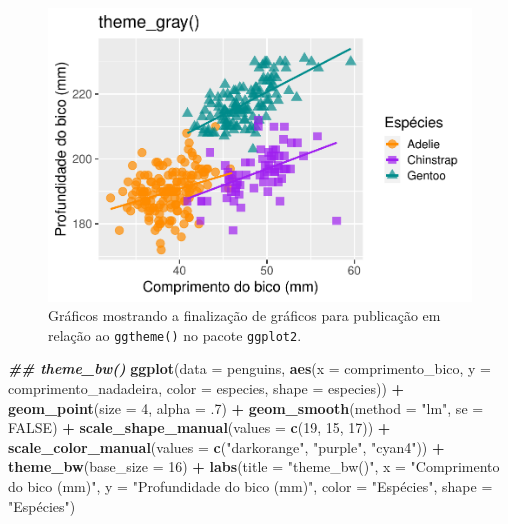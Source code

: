 \documentclass[
]{article}
\newenvironment{Shaded}{\begin{snugshade}}{\end{snugshade}}
\newcommand{\AttributeTok}[1]{\textcolor[rgb]{0.13,0.29,0.53}{#1}}
\newcommand{\ConstantTok}[1]{\textcolor[rgb]{0.56,0.35,0.01}{#1}}
\newcommand{\DecValTok}[1]{\textcolor[rgb]{0.00,0.00,0.81}{#1}}
\newcommand{\DocumentationTok}[1]{\textcolor[rgb]{0.56,0.35,0.01}{\textbf{\textit{#1}}}}
\newcommand{\FunctionTok}[1]{\textcolor[rgb]{0.13,0.29,0.53}{\textbf{#1}}}
\newcommand{\NormalTok}[1]{#1}
\newcommand{\SpecialCharTok}[1]{\textcolor[rgb]{0.81,0.36,0.00}{\textbf{#1}}}
\newcommand{\StringTok}[1]{\textcolor[rgb]{0.31,0.60,0.02}{#1}}
\begin{document}
\begin{figure}
\centering
\includegraphics{epr_files/figure-latex/fig-plot-final-ggtheme-1.pdf}
\caption{\label{fig:fig-plot-final-ggtheme-1}Gráficos mostrando a finalização de gráficos para publicação em relação ao \texttt{ggtheme()} no pacote \texttt{ggplot2}.}
\end{figure}

\begin{Shaded}
\begin{Highlighting}[]
\DocumentationTok{\#\# theme\_bw()}
\FunctionTok{ggplot}\NormalTok{(}\AttributeTok{data =}\NormalTok{ penguins, }
       \FunctionTok{aes}\NormalTok{(}\AttributeTok{x =}\NormalTok{ comprimento\_bico, }\AttributeTok{y =}\NormalTok{ comprimento\_nadadeira,}
           \AttributeTok{color =}\NormalTok{ especies, }\AttributeTok{shape =}\NormalTok{ especies)) }\SpecialCharTok{+}
    \FunctionTok{geom\_point}\NormalTok{(}\AttributeTok{size =} \DecValTok{4}\NormalTok{, }\AttributeTok{alpha =}\NormalTok{ .}\DecValTok{7}\NormalTok{) }\SpecialCharTok{+}
    \FunctionTok{geom\_smooth}\NormalTok{(}\AttributeTok{method =} \StringTok{"lm"}\NormalTok{, }\AttributeTok{se =} \ConstantTok{FALSE}\NormalTok{) }\SpecialCharTok{+}
    \FunctionTok{scale\_shape\_manual}\NormalTok{(}\AttributeTok{values =} \FunctionTok{c}\NormalTok{(}\DecValTok{19}\NormalTok{, }\DecValTok{15}\NormalTok{, }\DecValTok{17}\NormalTok{)) }\SpecialCharTok{+}
    \FunctionTok{scale\_color\_manual}\NormalTok{(}\AttributeTok{values =} \FunctionTok{c}\NormalTok{(}\StringTok{"darkorange"}\NormalTok{, }\StringTok{"purple"}\NormalTok{, }\StringTok{"cyan4"}\NormalTok{)) }\SpecialCharTok{+}
    \FunctionTok{theme\_bw}\NormalTok{(}\AttributeTok{base\_size =} \DecValTok{16}\NormalTok{) }\SpecialCharTok{+}
    \FunctionTok{labs}\NormalTok{(}\AttributeTok{title =} \StringTok{"theme\_bw()"}\NormalTok{, }\AttributeTok{x =} \StringTok{"Comprimento do bico (mm)"}\NormalTok{,}
         \AttributeTok{y =} \StringTok{"Profundidade do bico (mm)"}\NormalTok{, }\AttributeTok{color =} \StringTok{"Espécies"}\NormalTok{, }\AttributeTok{shape =} \StringTok{"Espécies"}\NormalTok{) }
\end{Highlighting}
\end{Shaded}
\end{document}

